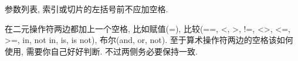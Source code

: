 \documentclass[a4paper,10pt,english]{sphinxmanual}
\begin{document}
%
\begin{sphinxVerbatim}[commandchars=\\\{\}]
      
            
           
\end{sphinxVerbatim}

参数列表, 索引或切片的左括号前不应加空格.

%
\begin{sphinxVerbatim}[commandchars=\\\{\}]
 
\end{sphinxVerbatim}

%
\begin{sphinxVerbatim}[commandchars=\\\{\}]
  
\end{sphinxVerbatim}

%
\begin{sphinxVerbatim}[commandchars=\\\{\}]
 \PYG{p}{[}\PYG{p}{]}  \PYG{p}{[}\PYG{p}{]}
\end{sphinxVerbatim}

%
\begin{sphinxVerbatim}[commandchars=\\\{\}]
   \PYG{p}{[}\PYG{p}{]}   \PYG{p}{[}\PYG{p}{]}
\end{sphinxVerbatim}

在二元操作符两边都加上一个空格, 比如赋值(=), 比较(==, \textless{}, \textgreater{}, !=, \textless{}\textgreater{}, \textless{}=, \textgreater{}=, in, not in, is, is not), 布尔(and, or, not).  至于算术操作符两边的空格该如何使用, 需要你自己好好判断. 不过两侧务必要保持一致.

%
\begin{sphinxVerbatim}[commandchars=\\\{\}]
   
\end{sphinxVerbatim}
\end{document}
